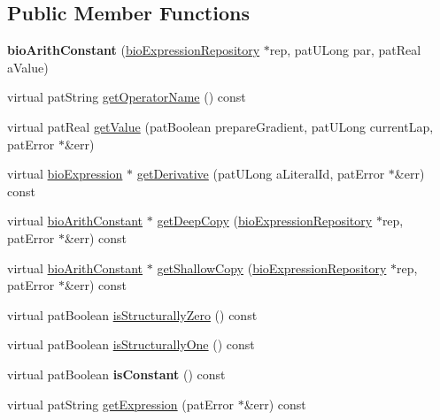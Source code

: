 \subsection*{Public Member Functions}
\begin{DoxyCompactItemize}
\item 
\mbox{\label{classbio_arith_constant_adab97ecd417c13ba7d839a93fde5d135}} 
{\bfseries bio\+Arith\+Constant} (\hyperlink{classbio_expression_repository}{bio\+Expression\+Repository} $\ast$rep, pat\+U\+Long par, pat\+Real a\+Value)
\item 
virtual pat\+String \hyperlink{classbio_arith_constant_a13a6799f54ffbbc8b43d54b213888fe0}{get\+Operator\+Name} () const
\item 
virtual pat\+Real \hyperlink{classbio_arith_constant_a60b9f8bf637586c0464356dfcf3bc4a3}{get\+Value} (pat\+Boolean prepare\+Gradient, pat\+U\+Long current\+Lap, pat\+Error $\ast$\&err)
\item 
virtual \hyperlink{classbio_expression}{bio\+Expression} $\ast$ \hyperlink{classbio_arith_constant_afbe5eaceb8943323f7bf0bfd3491b19a}{get\+Derivative} (pat\+U\+Long a\+Literal\+Id, pat\+Error $\ast$\&err) const
\item 
virtual \hyperlink{classbio_arith_constant}{bio\+Arith\+Constant} $\ast$ \hyperlink{classbio_arith_constant_af2f4fed6a41757d2cfa06a06b4d16923}{get\+Deep\+Copy} (\hyperlink{classbio_expression_repository}{bio\+Expression\+Repository} $\ast$rep, pat\+Error $\ast$\&err) const
\item 
virtual \hyperlink{classbio_arith_constant}{bio\+Arith\+Constant} $\ast$ \hyperlink{classbio_arith_constant_a521fe691fd4efd9f93ff95a0e478148d}{get\+Shallow\+Copy} (\hyperlink{classbio_expression_repository}{bio\+Expression\+Repository} $\ast$rep, pat\+Error $\ast$\&err) const
\item 
virtual pat\+Boolean \hyperlink{classbio_arith_constant_acd4439b84514d6612a97d422ba8f60c1}{is\+Structurally\+Zero} () const
\item 
virtual pat\+Boolean \hyperlink{classbio_arith_constant_a979ab2441d612a23a708fa3c10f3dd6a}{is\+Structurally\+One} () const
\item 
\mbox{\label{classbio_arith_constant_a6685609d7bba442f937a04f4885202df}} 
virtual pat\+Boolean {\bfseries is\+Constant} () const
\item 
virtual pat\+String \hyperlink{classbio_arith_constant_a50fd07c61fc6674c05f23345b972807c}{get\+Expression} (pat\+Error $\ast$\&err) const

\end{DoxyCompactItemize}

